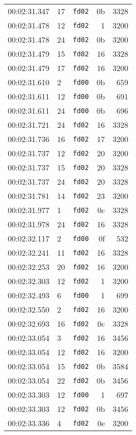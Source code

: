\documentclass{article}
\begin{document}
\begin{longtable}{lllrr}
00:02:31.347 & 17 & \texttt{fd02} & 0b & 3328 \\
00:02:31.478 & 12 & \texttt{fd02} & 1 & 3200 \\
00:02:31.478 & 24 & \texttt{fd02} & 0b & 3200 \\
00:02:31.479 & 15 & \texttt{fd02} & 16 & 3328 \\
00:02:31.479 & 17 & \texttt{fd02} & 16 & 3200 \\
00:02:31.610 & 2 & \texttt{fd00} & 0b & 659 \\
00:02:31.611 & 12 & \texttt{fd00} & 0b & 691 \\
00:02:31.611 & 24 & \texttt{fd00} & 0b & 696 \\
00:02:31.721 & 24 & \texttt{fd02} & 16 & 3328 \\
00:02:31.736 & 16 & \texttt{fd02} & 17 & 3200 \\
00:02:31.737 & 12 & \texttt{fd02} & 20 & 3200 \\
00:02:31.737 & 15 & \texttt{fd02} & 20 & 3328 \\
00:02:31.737 & 24 & \texttt{fd02} & 20 & 3328 \\
00:02:31.781 & 14 & \texttt{fd02} & 23 & 3200 \\
00:02:31.977 & 1 & \texttt{fd02} & 0c & 3328 \\
00:02:31.978 & 24 & \texttt{fd02} & 16 & 3328 \\
00:02:32.117 & 2 & \texttt{fd00} & 0f & 532 \\
00:02:32.241 & 11 & \texttt{fd02} & 16 & 3328 \\
00:02:32.253 & 20 & \texttt{fd02} & 16 & 3200 \\
00:02:32.303 & 12 & \texttt{fd02} & 1 & 3200 \\
00:02:32.493 & 6 & \texttt{fd00} & 1 & 699 \\
00:02:32.550 & 2 & \texttt{fd02} & 16 & 3200 \\
00:02:32.693 & 16 & \texttt{fd02} & 0c & 3328 \\
00:02:33.054 & 3 & \texttt{fd02} & 16 & 3456 \\
00:02:33.054 & 12 & \texttt{fd02} & 16 & 3200 \\
00:02:33.054 & 15 & \texttt{fd02} & 0b & 3584 \\
00:02:33.054 & 22 & \texttt{fd02} & 0b & 3456 \\
00:02:33.303 & 12 & \texttt{fd00} & 1 & 697 \\
00:02:33.303 & 12 & \texttt{fd02} & 0b & 3456 \\
00:02:33.336 & 4 & \texttt{fd02} & 0e & 3200 \\

\end{longtable}
\end{document}
